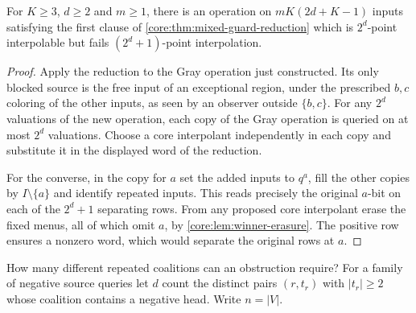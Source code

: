 \begin{corollary}
\label{core:cor:mixed-guard-locality}
For $K\geq3$, $d\geq2$ and $m\geq1$, there is an operation on
$mK(2d+K-1)$ inputs satisfying the first clause of
\cref{core:thm:mixed-guard-reduction} which is $2^d$-point
interpolable but fails $(2^d+1)$-point interpolation.
\end{corollary}
\begin{proof}
Apply the reduction to the Gray operation just constructed. Its
only blocked source is the free input of an exceptional region,
under the prescribed $b,c$ coloring of the other inputs, as seen
by an observer outside $\{b,c\}$. For any $2^d$ valuations of the
new operation, each copy of the Gray operation is queried on at
most $2^d$ valuations. Choose a core interpolant independently in
each copy and substitute it in the displayed word of the reduction.

For the converse, in the copy for $a$ set the added inputs to $q^a$,
fill the other copies by $I\setminus\{a\}$ and identify repeated
inputs. This reads precisely the original $a$-bit on each of the
$2^d+1$ separating rows. From any proposed core interpolant erase
the fixed menus, all of which omit $a$, by
\cref{core:lem:winner-erasure}. The positive row ensures a nonzero
word, which would separate the original rows at $a$.
\end{proof}

How many different repeated coalitions can an obstruction require?
For a family of negative source queries let $d$ count the distinct pairs
$(r,t_r)$ with $|t_r|\ge2$ whose coalition contains a negative head.
Write $n=|V|$.

